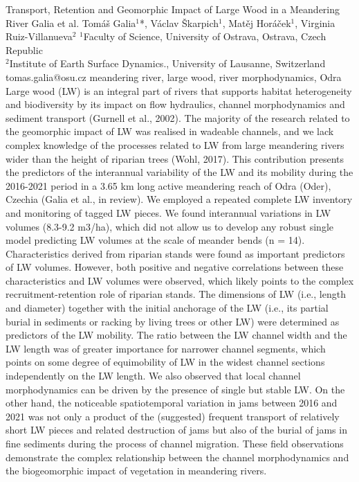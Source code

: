 \abstract
{Transport, Retention and Geomorphic Impact of Large Wood in a Meandering River
} %
{Galia et al.} %
{Tomáš Galia$^1$*, Václav Škarpich$^1$, Matěj Horáček$^1$, Virginia Ruiz-Villanueva$^2$} %
{\KLtag} %
{$^1$Faculty of Science, University of Ostrava, Ostrava, Czech Republic\\
$^2$Institute of Earth Surface Dynamics., University of Lausanne, Switzerland
} %
{tomas.galia@osu.cz}  %
{meandering river, large wood, river morphodynamics, Odra}%
{Large wood (LW) is an integral part of rivers that supports habitat heterogeneity and biodiversity by its impact on flow hydraulics, channel morphodynamics and sediment transport (Gurnell et al., 2002). The majority of the research related to the geomorphic impact of LW was realised in wadeable channels, and we lack complex knowledge of the processes related to LW from large meandering rivers wider than the height of riparian trees (Wohl, 2017). This contribution presents the predictors of the interannual variability of the LW and its mobility during the 2016-2021 period in a 3.65 km long active meandering reach of Odra (Oder), Czechia (Galia et al., in review). We employed a repeated complete LW inventory and monitoring of tagged LW pieces. We found interannual variations in LW volumes (8.3-9.2 m3/ha), which did not allow us to develop any robust single model predicting LW volumes at the scale of meander bends (n = 14). Characteristics derived from riparian stands were found as important predictors of LW volumes. However, both positive and negative correlations between these characteristics and LW volumes were observed, which likely points to the complex recruitment-retention role of riparian stands. The dimensions of LW (i.e., length and diameter) together with the initial anchorage of the LW (i.e., its partial burial in sediments or racking by living trees or other LW) were determined as predictors of the LW mobility. The ratio between the LW channel width and the LW length was of greater importance for narrower channel segments, which points on some degree of equimobility of LW in the widest channel sections independently on the LW length. We also observed that local channel morphodynamics can be driven by the presence of single but stable LW. On the other hand, the noticeable spatiotemporal variation in jams between 2016 and 2021 was not only a product of the (suggested) frequent transport of relatively short LW pieces and related destruction of jams but also of the burial of jams in fine sediments during the process of channel migration. These field observations demonstrate the complex relationship between the channel morphodynamics and the biogeomorphic impact of vegetation in meandering rivers.
}%
